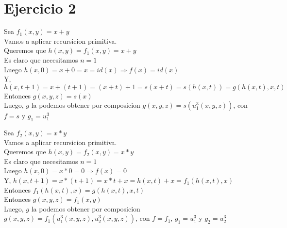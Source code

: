 \documentclass[]{article}
\title{}
\author{}
\begin{document}
\maketitle

\begin{abstract}

\end{abstract}

\section{Ejercicio 2}

\begin{flushleft}
Sea $f_{1}(x,y) = x + y$\linebreak
\\Vamos a aplicar recursicion primitiva. 
\\Queremos que $h(x,y) = f_{1}(x,y) = x + y$
\\Es claro que necesitamos $n=1$
\\Luego $h(x,0) = x + 0 = x = id(x) \Rightarrow f(x) = id(x)$
\\Y, $h(x,t+1) = x+(t+1) = (x+t)+1 = s(x+t) = s(h(x,t)) = g(h(x,t),x,t)$
\\Entonces $g(x,y,z) = s(x)$
\\Luego, $g$ la podemos obtener por composicion $g(x,y,z)=s(u^{3}_{1}(x,y,z))$, con $f = s$ y $g_{1} = u^{3}_{1}$

\end{flushleft}
\noindent\hrulefill
\begin{flushleft}
	Sea $f_{2}(x,y) = x * y$\linebreak
	\\Vamos a aplicar recursicion primitiva. 
	\\Queremos que $h(x,y) = f_{2}(x,y) = x * y$
	\\Es claro que necesitamos $n=1$
	\\Luego $h(x,0) = x * 0 = 0 \Rightarrow f(x) = 0$
	\\Y, $h(x,t+1) = x*(t+1) = x*t + x = h(x,t) + x = f_{1}(h(x,t),x)$
	\\Entonces 	$f_{1}(h(x,t),x) = g(h(x,t),x,t)$
	\\Entonces $g(x,y,z) = f_{1}(x,y)$
	\\Luego, $g$ la podemos obtener por composicion $g(x,y,z)=f_{1}(u^{3}_{1}(x,y,z),u^{3}_{2}(x,y,z))$, con $f = f_{1}$, $g_{1} = u^{3}_{1}$ y $g_{2} = u^{3}_{2}$
	
\end{flushleft}
\end{document}
